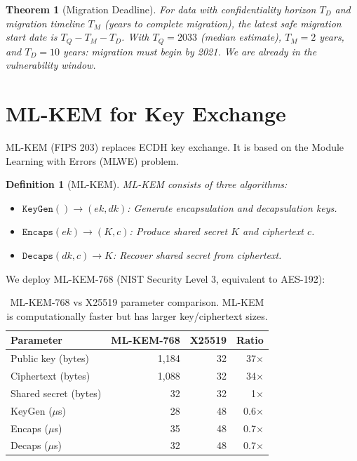 \documentclass[11pt]{article}
\newtheorem{theorem}{Theorem}
\newtheorem{definition}{Definition}
\begin{document}
\begin{theorem}[Migration Deadline]
For data with confidentiality horizon $T_D$ and migration timeline $T_M$
(years to complete migration), the latest safe migration start date is
$T_Q - T_M - T_D$. With $T_Q = 2033$ (median estimate), $T_M = 2$ years,
and $T_D = 10$ years: migration must begin by 2021. We are already in the
vulnerability window.
\end{theorem}

\section{ML-KEM for Key Exchange}
\label{sec:mlkem}

ML-KEM (FIPS 203) replaces ECDH key exchange. It is based on the Module
Learning with Errors (MLWE) problem.

\begin{definition}[ML-KEM]
ML-KEM consists of three algorithms:
\begin{itemize}[leftmargin=1.1em]
    \item $\texttt{KeyGen}() \to (ek, dk)$: Generate encapsulation and
    decapsulation keys.
    \item $\texttt{Encaps}(ek) \to (K, c)$: Produce shared secret $K$ and
    ciphertext $c$.
    \item $\texttt{Decaps}(dk, c) \to K$: Recover shared secret from
    ciphertext.
\end{itemize}
\end{definition}

We deploy ML-KEM-768 (NIST Security Level 3, equivalent to AES-192):

\begin{table}[H]
\centering
\small
\begin{tabular}{lrrr}
\toprule
\textbf{Parameter} & \textbf{ML-KEM-768} & \textbf{X25519} & \textbf{Ratio} \\
\midrule
Public key (bytes) & 1,184 & 32 & 37$\times$ \\
Ciphertext (bytes) & 1,088 & 32 & 34$\times$ \\
Shared secret (bytes) & 32 & 32 & 1$\times$ \\
KeyGen ($\mu$s) & 28 & 48 & 0.6$\times$ \\
Encaps ($\mu$s) & 35 & 48 & 0.7$\times$ \\
Decaps ($\mu$s) & 32 & 48 & 0.7$\times$ \\
\bottomrule
\end{tabular}
\caption{ML-KEM-768 vs X25519 parameter comparison. ML-KEM is computationally
faster but has larger key/ciphertext sizes.}
\label{tab:mlkem}
\end{table}
\end{document}
